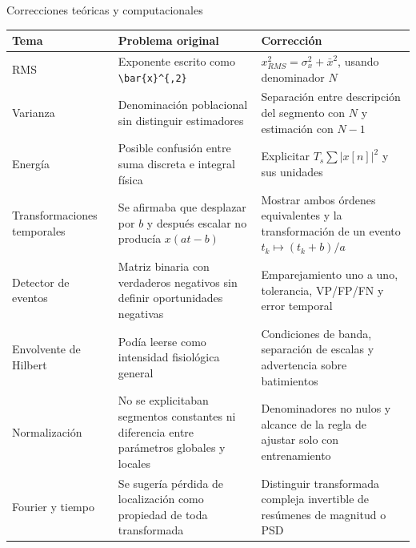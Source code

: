 \documentclass[
  10pt,
  ignorenonframetext,
  aspectratio=169,
  spanish,
]{beamer}
\begin{document}
\begin{frame}[fragile]{Correcciones teóricas y computacionales}
\label{correcciones-teuxf3ricas-y-computacionales}
\begin{longtable}[]{@{}
  >{\raggedright\arraybackslash}p{}
  >{\raggedright\arraybackslash}p{}
  >{\raggedright\arraybackslash}p{}@{}}
\toprule\noalign{}
\begin{minipage}[b]{\linewidth}\raggedright
Tema
\end{minipage} & \begin{minipage}[b]{\linewidth}\raggedright
Problema original
\end{minipage} & \begin{minipage}[b]{\linewidth}\raggedright
Corrección
\end{minipage} \\
\midrule\noalign{}
\endhead
RMS & Exponente escrito como \texttt{\textbackslash{}bar\{x\}\^{}\{,2\}}
& \(x_{RMS}^2=\sigma_x^2+\bar{x}^2\), usando denominador \(N\) \\
Varianza & Denominación poblacional sin distinguir estimadores &
Separación entre descripción del segmento con \(N\) y estimación con
\(N-1\) \\
Energía & Posible confusión entre suma discreta e integral física &
Explicitar \(T_s\sum|x[n]|^2\) y sus unidades \\
Transformaciones temporales & Se afirmaba que desplazar por \(b\) y
después escalar no producía \(x(at-b)\) & Mostrar ambos órdenes
equivalentes y la transformación de un evento \(t_k\mapsto(t_k+b)/a\) \\
Detector de eventos & Matriz binaria con verdaderos negativos sin
definir oportunidades negativas & Emparejamiento uno a uno, tolerancia,
VP/FP/FN y error temporal \\
Envolvente de Hilbert & Podía leerse como intensidad fisiológica general
& Condiciones de banda, separación de escalas y advertencia sobre
batimientos \\
Normalización & No se explicitaban segmentos constantes ni diferencia
entre parámetros globales y locales & Denominadores no nulos y alcance
de la regla de ajustar solo con entrenamiento \\
Fourier y tiempo & Se sugería pérdida de localización como propiedad de
toda transformada & Distinguir transformada compleja invertible de
resúmenes de magnitud o PSD \\

\end{longtable}
\end{frame}
\end{document}
